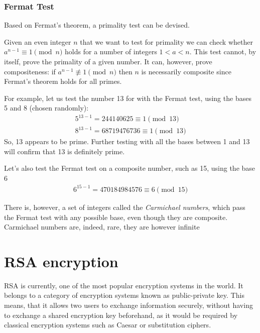 \documentclass[12pt, titlepage]{article}
\begin{document}
    \subsubsection{Fermat Test}
        Based on Fermat's theorem, a primality test can be devised.

        Given an even integer $n$ that we want to test for primality we can check whether
        $a^{n-1} \equiv 1 \pmod{n}$ holds for a number of integers $1<a<n$.  This test cannot,
        by itself, prove the primality of a given number. It can, however, prove compositeness:
        if $a^{n-1} \not\equiv 1 \pmod{n}$ then $n$ is necessarily composite since Fermat's
        theorem holds for all primes. \cite{primality_akalin}

        For example, let us test the number 13 for with the Fermat test, using the bases 5 and 8
        (chosen randomly):
        \begin{align*}
            5^{13-1} = 244140625   \equiv 1 \pmod{13}\\
            8^{13-1} = 68719476736 \equiv 1 \pmod{13}
        \end{align*}
        So, 13 appears to be prime. Further testing with all the bases between 1 and 13 will
        confirm that 13 is definitely prime.

        Let's also test the Fermat test on a composite number, such as 15, using the base 6
        \begin{align*}
            6^{15-1} = 470184984576 \equiv 6 \pmod{15}
        \end{align*}

        There is, however, a set of integers called the \emph{Carmichael numbers}, which pass
        the Fermat test with any possible base, even though they are composite. Carmichael
        numbers are, indeed, rare, they are however infinite



\section{RSA encryption}
RSA \autocite{rsa} is currently, one of the most popular encryption systems in the world.  It
belongs to a category of encryption systems known as public-private key.  This means, that
it allows two users to exchange information securely, without having to exchange a shared
encryption key beforehand, as it would be required by classical encryption systems such as
Caesar or substitution ciphers. 
\end{document}
